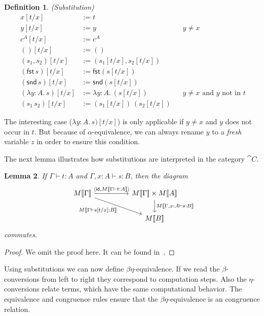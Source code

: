 \documentclass{article}
\newtheorem{defn}{Definition}[section]
\newtheorem{lemma}[defn]{Lemma}
\newcommand{\type}{\vdash}
\begin{document}
\begin{defn}{(Substitution)}
    \begin{align*}
        x[t/x] & := t\\
        y[t/x] & := y \qquad && y \neq x\\
        c^A[t/x] & := c^A\\
        ()[t/x] & := ()\\
        (s_1, s_2)[t/x] & := (s_1[t/x], s_2[t/x])\\
        (\mathsf{fst}\, s)[t/x] & := \mathsf{fst}(s[t/x])\\
        (\mathsf{snd}\, s)[t/x] & := \mathsf{snd}(s[t/x])\\
        (\lambda y:A.\, s)[t/x] & := \lambda y:A.\,(s[t/x]) \qquad && y \neq x \text{ and } y \text{ not in } t \\
        (s_1\, s_2)[t/x] & := (s_1[t/x])\,(s_2[t/x])
    \end{align*}
\end{defn}

The interesting case ($\lambda y: A.\, s)[t/x]$) is only applicable if $y \neq x$ and $y$ does not occur in $t$.
But because of $\alpha$-equivalence, we can always rename $y$ to a \emph{fresh} variable $z$ in order to ensure this condition.
\par
The next lemma illustrates how substitutions are interpreted in the category $\cat{C}$.

\begin{lemma}
    \label{lem:subst}
    If $\Gamma \type t: A$ and $\Gamma, x: A \type s: B$, then the diagram
    \[
        \begin{tikzcd}
            M \llbracket \Gamma \rrbracket \arrow{rr}{\langle \mathsf{id}, M\llbracket\Gamma \type t: A\rrbracket \rangle}
                                           \arrow{drr}[left=1cm, below]{M\llbracket\Gamma \type s[t/x] : B\rrbracket}
            & & M \llbracket\Gamma\rrbracket \times M \llbracket A \rrbracket \arrow{d}{M \llbracket\Gamma, x:A \type s: B\rrbracket} \\
            & & M \llbracket B \rrbracket
        \end{tikzcd}
    \]
    commutes.
\end{lemma}
\begin{proof}
    We omit the proof here.
    It can be found in~\cite{CT-STLC}.
\end{proof}

Using substitutions we can now define $\beta\eta$-equivalence.
If we read the $\beta$-conversions from left to right they correspond to computation steps.
Also the $\eta$-conversions relate terms, which have the same computational behavior.
The equivalence and congruence rules ensure that the $\beta\eta$-equivalence is an congruence relation.
\end{document}
